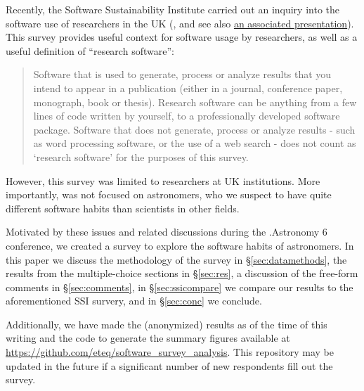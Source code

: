 Recently,  the Software Sustainability Institute carried out an inquiry into the software use of researchers in the UK  (\citealt{f824cd98-b953-4c08-96c8-2533188bc4c4}, and see also \href{http://wl.figshare.com/articles/1243288/embed?show_title=1}{an associated presentation}). This survey provides useful context for software usage by researchers, as well as a useful definition of ``research software'':
\begin{quote}
Software that is used to generate, process or analyze results that you intend to appear in a publication (either in a journal, conference paper, monograph, book or thesis). Research software can be anything from a few lines of code written by yourself, to a professionally developed software package. Software that does not generate, process or analyze results - such as word processing software, or the use of a web search - does not count as ‘research software’ for the purposes of this survey.
\end{quote}
However, this survey was limited to researchers at UK institutions.  More importantly, was not focused on astronomers, who we suspect to have quite different software habits than scientists in other fields.

Motivated by these issues and related discussions during the .Astronomy 6 conference, we created a survey to explore the software habits of astronomers.  In this paper we discuss the methodology of the survey in \S \ref{sec:datamethods}, the results from the multiple-choice sections in \S \ref{sec:res}, a discussion of the free-form comments in \S \ref{sec:comments}, in \S \ref{sec:ssicompare} we compare our results to the aforementioned SSI survery, and in \S \ref{sec:conc} we conclude.

Additionally, we have made the (anonymized) results as of the time of this writing and the code to generate the summary figures available at \url{https://github.com/eteq/software_survey_analysis}. This repository may be updated in the future if a significant number of new respondents fill out the survey.